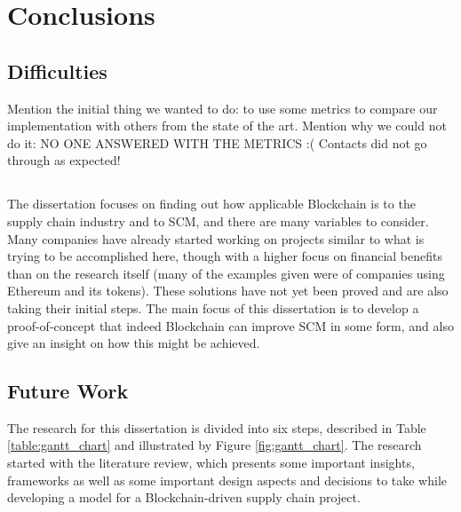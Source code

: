 \chapter{Conclusions}
\label{chap:conclusions}
\minitoc \mtcskip \noindent

\section{Difficulties}
Mention the initial thing we wanted to do: to use some metrics to compare our implementation with others from the state of the art.
Mention why we could not do it: NO ONE ANSWERED WITH THE METRICS :( Contacts did not go through as expected!

\section{}


The dissertation focuses on finding out how applicable Blockchain is to the supply chain industry and to SCM, and there are many variables to consider. Many companies have already started working on projects similar to what is trying to be accomplished here, though with a higher focus on financial benefits than on the research itself (many of the examples given were of companies using Ethereum and its tokens). These solutions have not yet been proved and are also taking their initial steps. The main focus of this dissertation is to develop a proof-of-concept that indeed Blockchain can improve SCM in some form, and also give an insight on how this might be achieved. 

\section{Future Work}


The research for this dissertation is divided into six steps, described in Table \ref{table:gantt_chart} and illustrated by Figure \ref{fig:gantt_chart}. The research started with the literature review, which presents some important insights, frameworks as well as some important design aspects and decisions to take while developing a model for a Blockchain-driven supply chain project.

